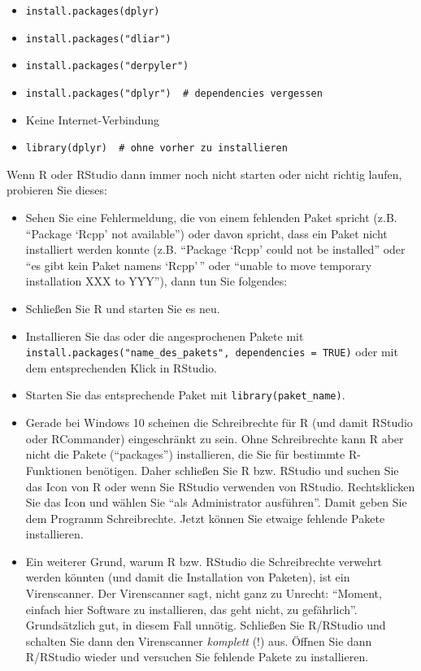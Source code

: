 \documentclass[12pt,ngerman,]{book}
\providecommand{\tightlist}{%
  \setlength{\itemsep}{0pt}\setlength{\parskip}{0pt}}
\begin{document}
\begin{itemize}
\tightlist
\item
  \texttt{install.packages(dplyr)}
\item
  \texttt{install.packages("dliar")}
\item
  \texttt{install.packages("derpyler")}
\item
  \texttt{install.packages("dplyr")\ \ \#\ dependencies\ vergessen}
\item
  Keine Internet-Verbindung
\item
  \texttt{library(dplyr)\ \ \#\ ohne\ vorher\ zu\ installieren}
\end{itemize}

Wenn R oder RStudio dann immer noch nicht starten oder nicht richtig
laufen, probieren Sie dieses:

\begin{itemize}
\item
  Sehen Sie eine Fehlermeldung, die von einem fehlenden Paket spricht
  (z.B. ``Package `Rcpp' not available'') oder davon spricht, dass ein
  Paket nicht installiert werden konnte (z.B. ``Package `Rcpp' could not
  be installed'' oder ``es gibt kein Paket namens `Rcpp'\,'' oder
  ``unable to move temporary installation XXX to YYY''), dann tun Sie
  folgendes:
\item
  Schließen Sie R und starten Sie es neu.
\item
  Installieren Sie das oder die angesprochenen Pakete mit
  \texttt{install.packages("name\_des\_pakets",\ dependencies\ =\ TRUE)}
  oder mit dem entsprechenden Klick in RStudio.
\item
  Starten Sie das entsprechende Paket mit \texttt{library(paket\_name)}.
\item
  Gerade bei Windows 10 scheinen die Schreibrechte für R (und damit
  RStudio oder RCommander) eingeschränkt zu sein. Ohne Schreibrechte
  kann R aber nicht die Pakete (``packages'') installieren, die Sie für
  bestimmte R-Funktionen benötigen. Daher schließen Sie R bzw. RStudio
  und suchen Sie das Icon von R oder wenn Sie RStudio verwenden von
  RStudio. Rechtsklicken Sie das Icon und wählen Sie ``als Administrator
  ausführen''. Damit geben Sie dem Programm Schreibrechte. Jetzt können
  Sie etwaige fehlende Pakete installieren.
\item
  Ein weiterer Grund, warum R bzw. RStudio die Schreibrechte verwehrt
  werden könnten (und damit die Installation von Paketen), ist ein
  Virenscanner. Der Virenscanner sagt, nicht ganz zu Unrecht: ``Moment,
  einfach hier Software zu installieren, das geht nicht, zu
  gefährlich''. Grundsätzlich gut, in diesem Fall unnötig. Schließen Sie
  R/RStudio und schalten Sie dann den Virenscanner \emph{komplett} (!)
  aus. Öffnen Sie dann R/RStudio wieder und versuchen Sie fehlende
  Pakete zu installieren.
\end{itemize}
\end{document}
